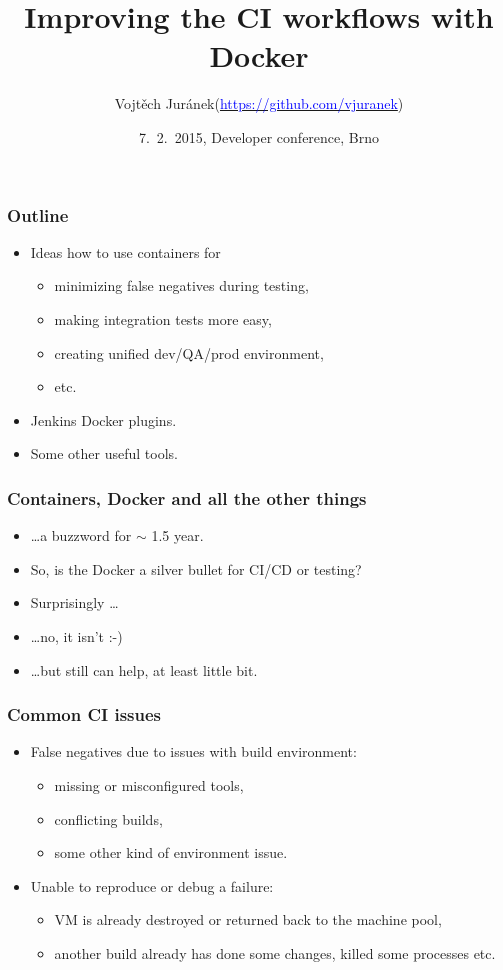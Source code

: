 \documentclass[10pt,utf8]{beamer}
\title{Improving the CI workflows with Docker}
\author[Vojtěch Juránek]{Vojtěch Juránek\newline\footnotesize{(\href{https://github.com/vjuranek}{\textcolor{blue}{https://github.com/vjuranek}}) }}
\institute[Red Hat]{JBoss - a division by Red Hat}
\date{7.~2.~2015, Developer conference, Brno}
\begin{document}
\begin{frame}
 \titlepage
\end{frame}


\begin{frame}
  \frametitle{Outline}
  \begin{itemize}
    \item Ideas how to use containers for 
    \begin{itemize}
      \item minimizing false negatives during testing,
      \item making integration tests more easy,
      \item creating unified dev/QA/prod environment,
      \item etc.
    \end{itemize}
    \item Jenkins Docker plugins.
    \item Some other useful tools.
  \end{itemize}
\end{frame}


\begin{frame}
	\frametitle{Containers, Docker and all the other things}
	\begin{itemize}
		\item \href{https://www.youtube.com/watch?v=2KmNIoMMtWA\#t=190}{} \dots a buzzword for $\sim$ 1.5 year.
		\pause
		\item So, is the Docker a silver bullet for CI/CD or testing?
		\pause
		\item Surprisingly \dots 
		\pause
		\item \dots no, it isn't :-)
		\pause
		\item \dots but still can help, at least little bit.
	\end{itemize}
\end{frame}

\begin{frame}
	\frametitle{Common CI issues}
	\begin{itemize}
		\item False negatives due to issues with build environment:
		\begin{itemize}
			\item missing or misconfigured tools,
			\item conflicting builds,
			\item some other kind of environment issue.
		\end{itemize}
		\item Unable to reproduce or debug a failure: 
		\begin{itemize}
			\item VM is already destroyed or returned back to the machine pool,
			\item another build already has done some changes, killed some processes etc.
		\end{itemize}
	\end{itemize}
\end{frame}
		
\end{document}
